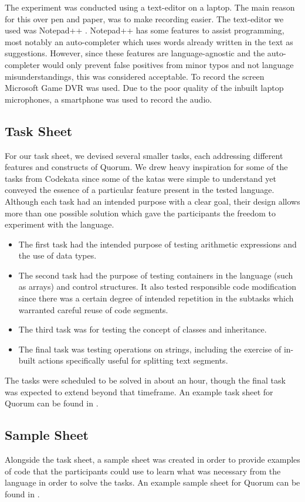 \documentclass[10pt]{sigplanconf}
\begin{document}
The experiment was conducted using a text-editor on a laptop.
The main reason for this over pen and paper, was to make recording easier.
The text-editor we used was Notepad++ \cite{Notepad}.
Notepad++ has some features to assist programming, most notably an auto-completer which uses words already written in the text as suggestions.
However, since these features are language-agnostic and the auto-completer would only prevent false positives from minor typos and not language misunderstandings, this was considered acceptable.
To record the screen Microsoft Game DVR was used.
Due to the poor quality of the inbuilt laptop microphones, a smartphone was used to record the audio.

\subsection{Task Sheet}
For our task sheet, we devised several smaller tasks, each addressing different features and constructs of Quorum. We drew heavy inspiration for some of the tasks from Codekata \cite{Codekata} since some of the katas were simple to understand yet conveyed the essence of a particular feature present in the tested language.
Although each task had an intended purpose with a clear goal, their design allows more than one possible solution which gave the participants the freedom to experiment with the language.
\begin{itemize}
\item The first task had the intended purpose of testing arithmetic expressions and the use of data types.
\item The second task had the purpose of testing containers in the language (such as arrays) and control structures.
It also tested responsible code modification since there was a certain degree of intended repetition in the subtasks which warranted careful reuse of code segments.%
\item The third task was for testing the concept of classes and inheritance.
\item The final task was testing operations on strings, including the exercise of in-built actions specifically useful for splitting text segments.
\end{itemize}
The tasks were scheduled to be solved in about an hour, though the final task was expected to extend beyond that timeframe.
An example task sheet for Quorum can be found in \cite{thesis}.

\subsection{Sample Sheet}
Alongside the task sheet, a sample sheet was created in order to provide examples of code that the participants could use to learn what was necessary from the language in order to solve the tasks. 
An example sample sheet for Quorum can be found in \cite{thesis}.
\end{document}
